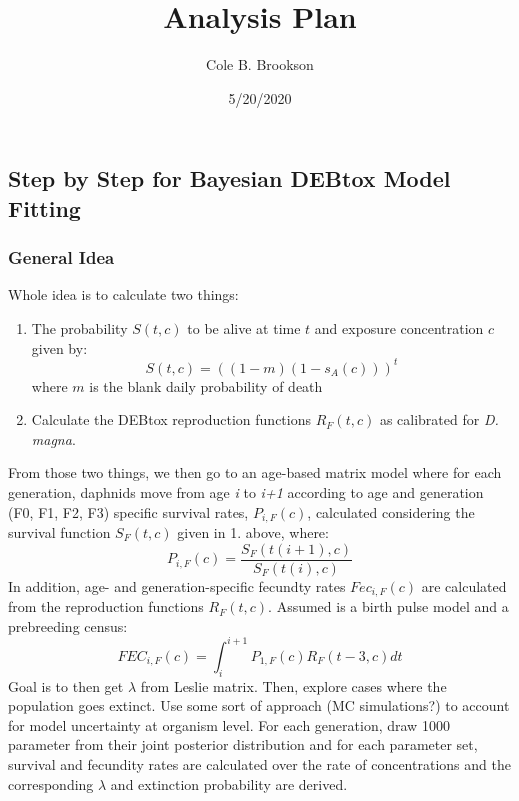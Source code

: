 \documentclass[
]{article}
\title{Analysis Plan}
\author{Cole B. Brookson}
\date{5/20/2020}
\providecommand{\tightlist}{%
  \setlength{\itemsep}{0pt}\setlength{\parskip}{0pt}}
\begin{document}
\maketitle

\hypertarget{step-by-step-for-bayesian-debtox-model-fitting}{%
\subsection{Step by Step for Bayesian DEBtox Model
Fitting}\label{step-by-step-for-bayesian-debtox-model-fitting}}

\hypertarget{general-idea}{%
\subsubsection{General Idea}\label{general-idea}}

Whole idea is to calculate two things:

\begin{enumerate}
\def\labelenumi{\arabic{enumi}.}
\tightlist
\item
  The probability \(S(t,c)\) to be alive at time \(t\) and exposure
  concentration \(c\) given by: \[ S(t,c) = ((1-m)(1-s_A(c)))^t\] where
  \(m\) is the blank daily probability of death
\item
  Calculate the DEBtox reproduction functions \(R_F(t,c)\) as calibrated
  for \emph{D. magna}.
\end{enumerate}

From those two things, we then go to an age-based matrix model where for
each generation, daphnids move from age \emph{i} to \emph{i+1} according
to age and generation (F0, F1, F2, F3) specific survival rates,
\(P_{i,F}(c)\), calculated considering the survival function
\(S_{F}(t,c)\) given in 1. above, where:
\[P_{i,F}(c) = \frac{S_F(t(i+1),c)}{S_F(t(i),c)}\] In addition, age- and
generation-specific fecundty rates \(Fec_{i,F}(c)\) are calculated from
the reproduction functions \(R_F(t,c)\). Assumed is a birth pulse model
and a prebreeding census:
\[FEC_{i,F}(c) = \int_{i}^{i+1}P_{1,F}(c)R_F(t-3,c)dt \] Goal is to then
get \(\lambda\) from Leslie matrix. Then, explore cases where the
population goes extinct. Use some sort of approach (MC simulations?) to
account for model uncertainty at organism level. For each generation,
draw 1000 parameter from their joint posterior distribution and for each
parameter set, survival and fecundity rates are calculated over the rate
of concentrations and the corresponding \(\lambda\) and extinction
probability are derived.
\end{document}
